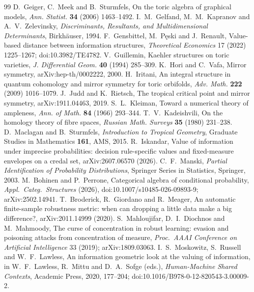 \documentclass[11pt]{article}
\theoremstyle{definition}\newtheorem{definition}[theorem]{Definition}\newtheorem{remark}[theorem]{Remark}\newtheorem{example}[theorem]{Example}\newtheorem{problem}[theorem]{Open problem}\crefname{problem}{Problem}{Problems}
\newcommand{\Peski}{P{\fontencoding{T1}\selectfont\k{e}}ski}
\begin{document}
\begin{thebibliography}{99}
 D.~Geiger, C.~Meek and B.~Sturmfels, On the toric algebra of graphical models, \emph{Ann. Statist.} \textbf{34} (2006) 1463--1492.
 I.~M.~Gelfand, M.~M.~Kapranov and A.~V.~Zelevinsky, \emph{Discriminants, Resultants, and Multidimensional Determinants}, Birkh\"auser, 1994.
 F.~Gensbittel, M.~\Peski{} and J.~Renault, Value-based distance between information structures, \emph{Theoretical Economics} 17 (2022) 1225--1267; doi:10.3982/TE4782.
 V.~Guillemin, Kaehler structures on toric varieties, \emph{J. Differential Geom.} \textbf{40} (1994) 285--309.
 K.~Hori and C.~Vafa, Mirror symmetry, arXiv:hep-th/0002222, 2000.
 H.~Iritani, An integral structure in quantum cohomology and mirror symmetry for toric orbifolds, \emph{Adv. Math.} \textbf{222} (2009) 1016--1079.
 J.~Judd and K.~Rietsch, The tropical critical point and mirror symmetry, arXiv:1911.04463, 2019.
 S.~L.~Kleiman, Toward a numerical theory of ampleness, \emph{Ann. of Math.} \textbf{84} (1966) 293--344.
 T.~V.~Kadeishvili, On the homology theory of fibre spaces, \emph{Russian Math. Surveys} \textbf{35} (1980) 231--238.
 D.~Maclagan and B.~Sturmfels, \emph{Introduction to Tropical Geometry}, Graduate Studies in Mathematics \textbf{161}, AMS, 2015.
 R.~Iskandar, Value of information under imprecise probabilities: decision rule-specific values and fixed-measure envelopes on a credal set, arXiv:2607.06570 (2026).
 C.~F.~Manski, \emph{Partial Identification of Probability Distributions}, Springer Series in Statistics, Springer, 2003.
 M.~Bohinen and P.~Perrone, Categorical algebra of conditional probability, \emph{Appl.\ Categ.\ Structures} (2026), doi:10.1007/s10485-026-09893-9; arXiv:2502.14941.
 T.~Broderick, R.~Giordano and R.~Meager, An automatic finite-sample robustness metric: when can dropping a little data make a big difference?, arXiv:2011.14999 (2020).
 S.~Mahloujifar, D.~I.~Diochnos and M.~Mahmoody, The curse of concentration in robust learning: evasion and poisoning attacks from concentration of measure, \emph{Proc.\ AAAI Conference on Artificial Intelligence} 33 (2019); arXiv:1809.03063.
 I.~S.~Moskowitz, S.~Russell and W.~F.~Lawless, An information geometric look at the valuing of information, in W.~F.~Lawless, R.~Mittu and D.~A.~Sofge (eds.), \emph{Human-Machine Shared Contexts}, Academic Press, 2020, 177--204; doi:10.1016/B978-0-12-820543-3.00009-2.

\end{thebibliography}
\end{document}
